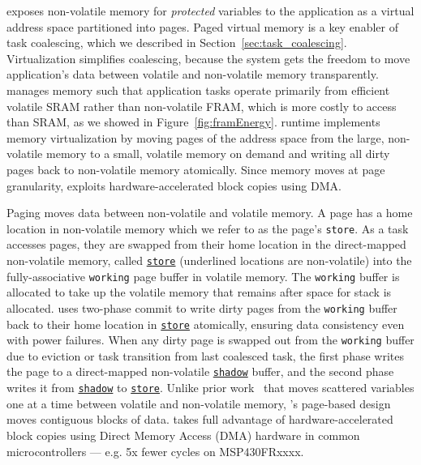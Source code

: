 \sys exposes non-volatile memory for \emph{protected} variables to
the application as a virtual address space partitioned into pages.
Paged virtual memory is a key enabler of task coalescing, which
we described in Section~\ref{sec:task_coalescing}. Virtualization simplifies
coalescing, because the system gets the freedom to move application's data
between volatile and non-volatile memory transparently.
%
\sys manages memory such that application tasks operate primarily from
efficient volatile SRAM rather than non-volatile FRAM, which is more costly to access than SRAM,
as we showed in Figure~\ref{fig:framEnergy}. \sys runtime implements memory
virtualization by moving pages of the address space from the large,
non-volatile memory to a small, volatile memory on demand and writing all dirty
pages back to non-volatile memory atomically. Since memory moves at page granularity, \sys
exploits hardware\hyp{}accelerated block copies using DMA.


Paging moves data between non-volatile and volatile memory. A page has a home
location in non-volatile memory which we refer to as the page's {\tt store}.
As a task accesses pages, they are swapped from their home location
in the direct\hyp{}mapped non-volatile memory, called
\texttt{\underline{store}} (underlined locations are non-volatile) 
into the fully\hyp{}associative \texttt{working} page buffer in volatile memory. The
\texttt{working} buffer is allocated to take up the volatile memory that
remains after space for stack is allocated.
%
\sys uses two-phase commit to write dirty pages from the \texttt{working} buffer
back to their home location in \texttt{\underline{store}} atomically,
ensuring data consistency even with power failures.
%
When any dirty page is swapped out from the \texttt{working} buffer due to
eviction or task transition from last coalesced task, the first phase writes
the page to a direct\hyp{}mapped non-volatile \texttt{\underline{shadow}}
buffer, and the second phase writes it from
\texttt{\underline{shadow}} to \texttt{\underline{store}}.
%
Unlike prior work~\cite{chain,alpaca} that moves scattered variables one at a
time between volatile and non-volatile memory, \sys's page-based
design moves contiguous blocks of data.
%
\sys takes full advantage of hardware\hyp{}accelerated block copies using
Direct Memory Access (DMA) hardware in common microcontrollers --- e.g. 5x
fewer cycles on MSP430FRxxxx.


